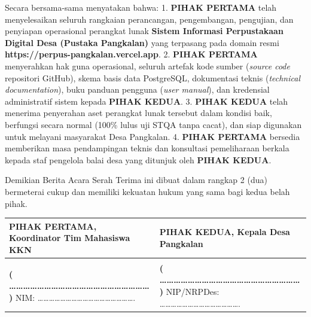 \documentclass[
  indonesian,
  12pt,
]{report}
\newcounter{none} %
\begin{document}
Secara bersama-sama menyatakan bahwa: 1. \textbf{PIHAK PERTAMA} telah
menyelesaikan seluruh rangkaian perancangan, pengembangan, pengujian,
dan penyiapan operasional perangkat lunak \textbf{Sistem Informasi
Perpustakaan Digital Desa (Pustaka Pangkalan)} yang terpasang pada
domain resmi \textbf{https://perpus-pangkalan.vercel.app}. 2.
\textbf{PIHAK PERTAMA} menyerahkan hak guna operasional, seluruh artefak
kode sumber (\emph{source code} repositori GitHub), skema basis data
PostgreSQL, dokumentasi teknis (\emph{technical documentation}), buku
panduan pengguna (\emph{user manual}), dan kredensial administratif
sistem kepada \textbf{PIHAK KEDUA}. 3. \textbf{PIHAK KEDUA} telah
menerima penyerahan aset perangkat lunak tersebut dalam kondisi baik,
berfungsi secara normal (100\% lulus uji STQA tanpa cacat), dan siap
digunakan untuk melayani masyarakat Desa Pangkalan. 4. \textbf{PIHAK
PERTAMA} bersedia memberikan masa pendampingan teknis dan konsultasi
pemeliharaan berkala kepada staf pengelola balai desa yang ditunjuk oleh
\textbf{PIHAK KEDUA}.

Demikian Berita Acara Serah Terima ini dibuat dalam rangkap 2 (dua)
bermeterai cukup dan memiliki kekuatan hukum yang sama bagi kedua belah
pihak.

\vspace{1.5cm}

{\def\LTcaptype{none} %
\begin{longtable}[]{@{}
  >{\centering\arraybackslash}p{}
  >{\centering\arraybackslash}p{}@{}}
\toprule\noalign{}
\begin{minipage}[b]{\linewidth}\centering
PIHAK PERTAMA, \textbf{Koordinator Tim Mahasiswa KKN}
\end{minipage} & \begin{minipage}[b]{\linewidth}\centering
PIHAK KEDUA, \textbf{Kepala Desa Pangkalan}
\end{minipage} \\
\midrule\noalign{}
\endhead
\bottomrule\noalign{}
\endlastfoot
\vspace{2.5cm} & \vspace{2.5cm} \\
\textbf{(
\ldots\ldots\ldots\ldots\ldots\ldots\ldots\ldots\ldots\ldots\ldots\ldots\ldots\ldots\ldots\ldots\ldots\ldots\ldots\ldots{}
)} NIM:
\ldots\ldots\ldots\ldots\ldots\ldots\ldots\ldots\ldots\ldots\ldots\ldots\ldots\ldots\ldots\ldots\ldots.
& \textbf{(
\ldots\ldots\ldots\ldots\ldots\ldots\ldots\ldots\ldots\ldots\ldots\ldots\ldots\ldots\ldots\ldots\ldots\ldots\ldots\ldots{}
)} NIP/NRPDes:
\ldots\ldots\ldots\ldots\ldots\ldots\ldots\ldots\ldots\ldots\ldots\ldots\ldots\ldots. \\
\end{longtable}
}
\end{document}
